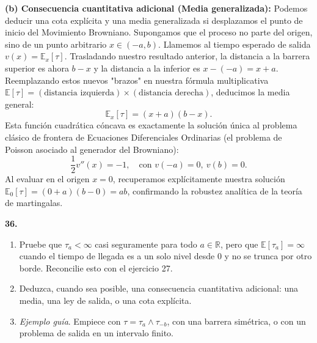 \documentclass[11pt, letterpaper]{article}
\begin{document}
\begin{solucion}
    \textbf{(b) Consecuencia cuantitativa adicional (Media generalizada):}
    Podemos deducir una cota explícita y una media generalizada si desplazamos el punto de inicio del Movimiento Browniano. Supongamos que el proceso no parte del origen, sino de un punto arbitrario $x \in (-a, b)$.
    Llamemos al tiempo esperado de salida $v(x) = \mathbb{E}_x[\tau]$. 
    Trasladando nuestro resultado anterior, la distancia a la barrera superior es ahora $b-x$ y la distancia a la inferior es $x - (-a) = x+a$.
    Reemplazando estos nuevos "brazos" en nuestra fórmula multiplicativa $\mathbb{E}[\tau] = (\text{distancia izquierda}) \times (\text{distancia derecha})$, deducimos la media general:
    \[ \mathbb{E}_x[\tau] = (x+a)(b-x). \]
    Esta función cuadrática cóncava es exactamente la solución única al problema clásico de frontera de Ecuaciones Diferenciales Ordinarias (el problema de Poisson asociado al generador del Browniano):
    \[ \frac{1}{2}v''(x) = -1, \quad \text{con } v(-a) = 0, \ v(b) = 0. \]
    Al evaluar en el origen $x=0$, recuperamos explícitamente nuestra solución $\mathbb{E}_0[\tau] = (0+a)(b-0) = ab$, confirmando la robustez analítica de la teoría de martingalas.
\end{solucion}

\newpage

\begin{ejercicio}
    \textbf{36.} 
    \begin{enumerate}
        \item Pruebe que $\tau_a < \infty$ casi seguramente para todo $a \in \mathbb{R}$, pero que $\mathbb{E}[\tau_a] = \infty$ cuando el tiempo de llegada es a un solo nivel desde $0$ y no se trunca por otro borde. Reconcilie esto con el ejercicio 27.
        \item Deduzca, cuando sea posible, una consecuencia cuantitativa adicional: una media, una ley de salida, o una cota explícita.
        \item \textit{Ejemplo guía}. Empiece con $\tau = \tau_a \wedge \tau_{-b}$, con una barrera simétrica, o con un problema de salida en un intervalo finito.
    \end{enumerate}
\end{ejercicio}

\vspace{5mm}
\end{document}
